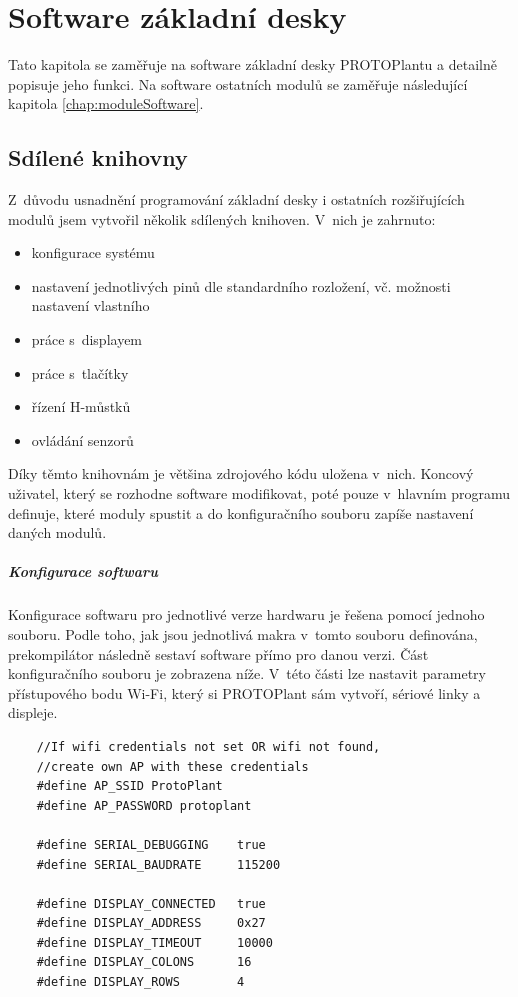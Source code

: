 \chapter{Software základní desky}
Tato kapitola se zaměřuje na software základní desky PROTOPlantu a detailně popisuje jeho funkci.
Na software ostatních modulů se zaměřuje následu\-jí\-cí kapitola \ref{chap:moduleSoftware}.


\section{Sdílené knihovny}
Z~důvodu usnadnění programování základní desky i ostatních rozšiřujících modulů jsem vytvořil několik sdílených knihoven. 
V~nich je zahrnuto:
\begin{itemize}
    \item konfigurace systému
    \item nastavení jednotlivých pinů dle standardního rozložení, vč. možnosti nastavení vlastního
    \item práce s~displayem
    \item práce s~tlačítky
    \item řízení H-můstků
    \item ovládání senzorů
\end{itemize}
Díky těmto knihovnám je většina zdrojového kódu uložena v~nich. 
Koncový uživatel, který se rozhodne software modifikovat, poté pouze v~hlavním programu definuje, které moduly spustit a do konfiguračního souboru zapíše nastavení daných modulů.

\paragraph{Konfigurace softwaru}
Konfigurace softwaru pro jednotlivé verze hardwaru je řešena pomocí jednoho souboru.
Podle toho, jak jsou jednotlivá makra v~tomto souboru definována, prekompilátor následně sestaví software přímo pro danou verzi.
Část konfiguračního souboru je zobrazena níže.
V~této části lze nastavit parametry přístupového bodu Wi-Fi, který si PROTOPlant sám vytvoří, sériové linky a displeje.
\begin{lstlisting}
    //If wifi credentials not set OR wifi not found, 
    //create own AP with these credentials
    #define AP_SSID ProtoPlant
    #define AP_PASSWORD protoplant
    
    #define SERIAL_DEBUGGING    true
    #define SERIAL_BAUDRATE     115200
    
    #define DISPLAY_CONNECTED   true
    #define DISPLAY_ADDRESS     0x27
    #define DISPLAY_TIMEOUT     10000
    #define DISPLAY_COLONS      16
    #define DISPLAY_ROWS        4
\end{lstlisting}

